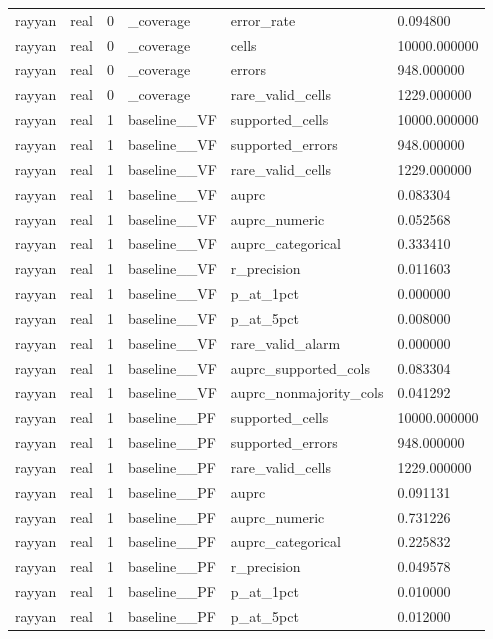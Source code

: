 \begin{tabular}{llllll}
rayyan & real & 0 & \_coverage & error\_rate & 0.094800 \\
rayyan & real & 0 & \_coverage & cells & 10000.000000 \\
rayyan & real & 0 & \_coverage & errors & 948.000000 \\
rayyan & real & 0 & \_coverage & rare\_valid\_cells & 1229.000000 \\
rayyan & real & 1 & baseline\_\_VF & supported\_cells & 10000.000000 \\
rayyan & real & 1 & baseline\_\_VF & supported\_errors & 948.000000 \\
rayyan & real & 1 & baseline\_\_VF & rare\_valid\_cells & 1229.000000 \\
rayyan & real & 1 & baseline\_\_VF & auprc & 0.083304 \\
rayyan & real & 1 & baseline\_\_VF & auprc\_numeric & 0.052568 \\
rayyan & real & 1 & baseline\_\_VF & auprc\_categorical & 0.333410 \\
rayyan & real & 1 & baseline\_\_VF & r\_precision & 0.011603 \\
rayyan & real & 1 & baseline\_\_VF & p\_at\_1pct & 0.000000 \\
rayyan & real & 1 & baseline\_\_VF & p\_at\_5pct & 0.008000 \\
rayyan & real & 1 & baseline\_\_VF & rare\_valid\_alarm & 0.000000 \\
rayyan & real & 1 & baseline\_\_VF & auprc\_supported\_cols & 0.083304 \\
rayyan & real & 1 & baseline\_\_VF & auprc\_nonmajority\_cols & 0.041292 \\
rayyan & real & 1 & baseline\_\_PF & supported\_cells & 10000.000000 \\
rayyan & real & 1 & baseline\_\_PF & supported\_errors & 948.000000 \\
rayyan & real & 1 & baseline\_\_PF & rare\_valid\_cells & 1229.000000 \\
rayyan & real & 1 & baseline\_\_PF & auprc & 0.091131 \\
rayyan & real & 1 & baseline\_\_PF & auprc\_numeric & 0.731226 \\
rayyan & real & 1 & baseline\_\_PF & auprc\_categorical & 0.225832 \\
rayyan & real & 1 & baseline\_\_PF & r\_precision & 0.049578 \\
rayyan & real & 1 & baseline\_\_PF & p\_at\_1pct & 0.010000 \\
rayyan & real & 1 & baseline\_\_PF & p\_at\_5pct & 0.012000 \\

\end{tabular}
